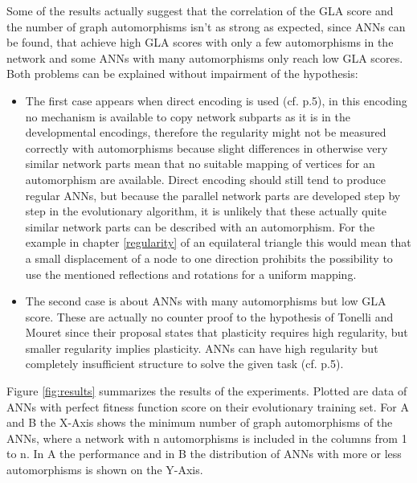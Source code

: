 \documentclass[12pt,twoside]{article}
\theoremstyle{plain}
\theoremstyle{definition}
\theoremstyle{remark}
\begin{document}
Some of the results actually suggest that the correlation of the GLA score and the number of graph automorphisms isn't as strong as expected, since ANNs can be found, that achieve high GLA scores with only a few automorphisms in the network and some ANNs with many automorphisms only reach low GLA scores. Both problems can be explained without impairment of the hypothesis:
\begin{itemize}
	\item The first case appears when direct encoding is used (cf. \cite{citeulike:12788284} p.5), in this encoding no mechanism is available to copy network subparts as it is in the developmental encodings, therefore the regularity might not be measured correctly with automorphisms because slight differences in otherwise very similar network parts mean that no suitable mapping of vertices for an automorphism are available. Direct encoding should still tend to produce regular ANNs, but because the parallel network parts are developed step by step in the evolutionary algorithm, it is unlikely that these actually quite similar network parts can be described with an automorphism.
	For the example in chapter \ref{regularity} of an equilateral triangle this would mean that a small displacement of a node to one direction prohibits the possibility to use the mentioned reflections and rotations for a uniform mapping.
	\item The second case is about ANNs with many automorphisms but low GLA score. These are actually no counter proof to the hypothesis of Tonelli and Mouret since their proposal states that plasticity requires high regularity, but smaller regularity implies plasticity. ANNs can have high regularity but completely insufficient structure to solve the given task (cf. \cite{citeulike:12788284} p.5).
\end{itemize} 

Figure \ref{fig:results} summarizes the results of the experiments. Plotted are data of ANNs with perfect fitness function score on their evolutionary training set.
For A and B the X-Axis shows the minimum number of graph automorphisms of the ANNs, where a network with n automorphisms is included in the columns from 1 to n. In A the performance and in B the distribution of ANNs with more or less automorphisms is shown on the Y-Axis.
\end{document}
